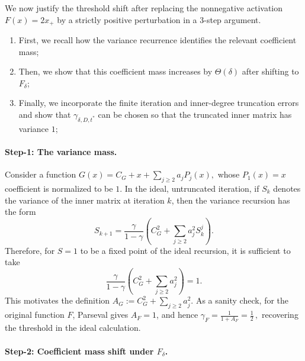 \documentclass[12pt]{article}
\begin{document}
We now justify the threshold shift after replacing the nonnegative activation
\(F(x)=2x_+\) by a strictly positive perturbation in a 3-step argument.
\begin{enumerate}
	\item  First, we recall how the variance recurrence identifies the relevant
coefficient mass;
\item  Then, we show that this coefficient mass increases by
\(\Theta(\delta)\) after shifting to \(F_\delta\);
\item Finally, we incorporate the
finite iteration and inner-degree truncation errors and show that \(\gamma_{\delta,D,t^*}\) can be chosen so that the truncated inner matrix has variance \(1\);
\end{enumerate} 

\paragraph{Step-1: The variance mass.}

Consider a function
\(
    G(x)=C_G+x+\sum_{j\ge2} a_j P_j(x),
\)
whose \(P_1(x)=x\) coefficient is normalized to be \(1\).  In the ideal,
untruncated iteration, if \(S_k\) denotes the variance of the inner matrix at
iteration \(k\), then the variance recursion has the form
\[
    S_{k+1}
    =
    \frac{\gamma}{1-\gamma}
    \left(
        C_G^2+\sum_{j\ge2} a_j^2 S_k^j
    \right).
\]
Therefore, for \(S=1\) to be a fixed point of the ideal recursion, it is
sufficient to take
\[
    \frac{\gamma}{1-\gamma}
    \left(
        C_G^2+\sum_{j\ge2}a_j^2
    \right)
    =
    1.
\]
This motivates the definition
\(
    A_G
    :=
    C_G^2+\sum_{j\ge2}a_j^2.
\)
As a sanity check, for the original function $F$,  Parseval gives  \(A_F=1\), and hence
\(
    \gamma_F=\frac{1}{1+A_F}=\frac12\,,
\)
 recovering the threshold in the ideal calculation.

\paragraph{Step-2: Coefficient mass shift under \(F_\delta\).}
\end{document}
